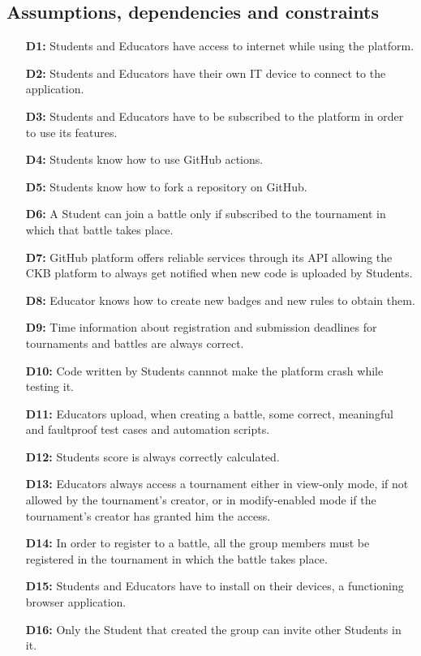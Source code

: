\documentclass{article}
\begin{document}
{%
\newpage

\subsection{Assumptions, dependencies and constraints}
\begin{itemize}
    \item[\textbf{D1:}] Students and Educators have access to internet while using the platform.
    \item[\textbf{D2:}] Students and Educators have their own IT device to connect to the application.
    \item[\textbf{D3:}] Students and Educators have to be subscribed to the platform in order to use its features.
    \item[\textbf{D4:}] Students know how to use GitHub actions.
    \item[\textbf{D5:}] Students know how to fork a repository on GitHub.
    \item[\textbf{D6:}] A Student can join a battle only if subscribed to the tournament in which that battle takes place.
    \item[\textbf{D7:}] GitHub platform offers reliable services through its API allowing the CKB platform to always get notified when new code is uploaded by Students.
    \item[\textbf{D8:}] Educator knows how to create new badges and new rules to obtain them.
    \item[\textbf{D9:}] Time information about registration and submission deadlines for tournaments and battles are always correct.
    \item[\textbf{D10:}] Code written by Students cannnot make the platform crash while testing it.
    \item[\textbf{D11:}] Educators upload, when creating a battle, some correct, meaningful and faultproof test cases and automation scripts.
    \item[\textbf{D12:}] Students score is always correctly calculated.
    \item[\textbf{D13:}] Educators always access a tournament either in view-only mode, if not allowed by the tournament's creator, or in modify-enabled mode if the
     tournament's creator has granted him the access.
    \item[\textbf{D14:}] In order to register to a battle, all the group members must be registered in the tournament
          in which the battle takes place.
    \item[\textbf{D15:}] Students and Educators have to install on their devices, a functioning browser application.
    \item[\textbf{D16:}] Only the Student that created the group can invite other Students in it.
\end{itemize}


}
\end{document}
